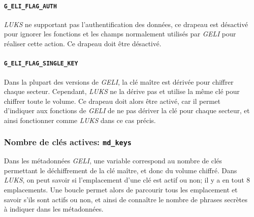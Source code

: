 \paragraph{\texttt{G\_ELI\_FLAG\_AUTH}}
\textit{LUKS} ne supportant pas l'authentification des données, ce drapeau est
désactivé pour ignorer les fonctions et les champs normalement utilisés par
\textit{GELI} pour réaliser cette action. Ce drapeau doit être désactivé.
\paragraph{\texttt{G\_ELI\_FLAG\_SINGLE\_KEY}}
Dans la plupart des versions de \textit{GELI}, la clé maître est dérivée pour
chiffrer chaque secteur. Cependant, \textit{LUKS} ne la dérive pas et utilise la
même clé pour chiffrer toute le volume. Ce drapeau doit alors être activé, car
il permet d'indiquer aux fonctions de \textit{GELI} de ne pas dériver la clé
pour chaque secteur, et ainsi fonctionner comme \textit{LUKS} dans ce cas
précis.

\subsubsection{Nombre de clés actives: \texttt{md\_keys}}
Dans les métadonnées \textit{GELI}, une variable correspond au nombre de clés
permettant le déchiffrement de la clé maître, et donc du volume chiffré. Dans
\textit{LUKS}, on peut savoir si l'emplacement d'une clé est actif ou non; il y
a en tout 8 emplacements. Une boucle permet alors de parcourir tous les
emplacement et savoir s'ils sont actifs ou non, et ainsi de connaître le nombre
de phrases secrètes à indiquer dans les métadonnées.
